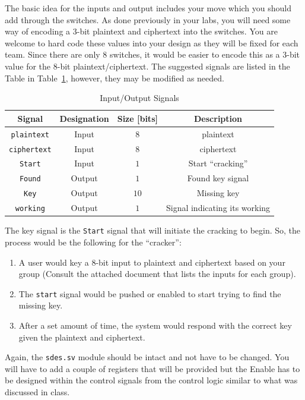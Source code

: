 \documentclass{article}
\begin{document}
The basic idea for the inputs and output includes your move which you
should add through the switches.  As done previously in your labs, you
will need some way of encoding a $3$-bit plaintext and ciphertext into
the switches.  You are welcome to hard code these values into your
design as they will be fixed for each team.  
Since there are only $8$ switches, it would be easier to encode this
as a $3$-bit value for the $8$-bit plaintext/ciphertext.
The suggested signals are listed in the Table in
Table~\ref{io.tbl}, however, they may be modified as needed.
\begin{table}
  \centering
  \begin{tabular}{|c|c|c|c|} \hline
    Signal & Designation & Size [bits] & Description \\ \hline
    \verb!plaintext!  & Input  & $8$  & plaintext \\ \hline
    \verb!ciphertext! & Input  & $8$  & ciphertext \\ \hline
    \verb!Start!      & Input  & $1$  & Start ``cracking'' \\ \hline
    \verb!Found!      & Output & $1$  & Found key signal \\ \hline
    \verb!Key!        & Output & $10$ & Missing key \\ \hline
    \verb!working!    & Output & $1$  & Signal indicating its working \\ \hline
  \end{tabular}
  \caption{Input/Output Signals}
  \label{io.tbl}
\end{table}

The key signal is the \verb!Start! signal that will initiate the
cracking to begin.  So,
the process would be the following for the ``cracker'':
\begin{enumerate}
\item A user would key a $8$-bit input to plaintext and ciphertext
  based on your group (Consult the attached document that lists the
  inputs for each group).
\item The \verb!start! signal would be pushed or enabled to start
  trying to find the missing key.
\item After a set amount of time, the system would respond with the
  correct key given the plaintext and ciphertext.
\end{enumerate}
Again, the \verb!sdes.sv! module should be intact and not have to
be changed.   You will have to add a couple of registers that will
be provided but the Enable has to be designed within the control
signals from the control logic similar to what was discussed in
class.
\end{document}
